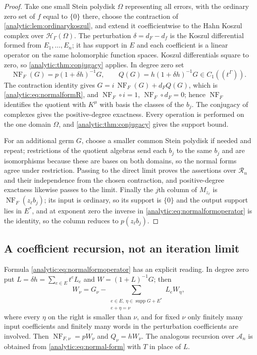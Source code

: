 \documentclass[11pt,letterpaper]{article}
\theoremstyle{definition}
\theoremstyle{remark}
\newcommand{\A}{\mathscr A}
\newcommand{\RR}{\mathscr R}
\newcommand{\HH}{\mathcal H}
\newcommand{\supp}{\operatorname{supp}}
\newcommand{\NF}{\operatorname{NF}}
\numberwithin{equation}{section}
\begin{document}
\begin{proof}
Take one small Stein polydisk $\Omega$ representing all errors, with the
ordinary zero set of $f$ equal to $\{0\}$ there, choose the contraction of
\cref{analytic:lem:ordinarykoszul}, and extend it coefficientwise to the
Hahn Koszul complex over $\HH_\Gamma(\Omega)$. The perturbation
$\delta=d_F-d_f$ is the Koszul differential formed from $E_1,\ldots,E_n$; it
has support in $E$ and each coefficient is a linear operator on the same
holomorphic function spaces. Koszul differentials square to zero, so
\cref{analytic:thm:conjugacy} applies. In degree zero set
\begin{equation}\label{analytic:eq:normalformoperator}
 \NF_F(G)=p(1+\delta h)^{-1}G,\qquad
 Q(G)=h(1+\delta h)^{-1}G\in C_1((t^\Gamma)).
\end{equation}
The contraction identity gives $G=i\,\NF_F(G)+d_FQ(G)$, which is
\eqref{analytic:eq:normalformR}, and $\NF_F\circ i=1$,
$\NF_F\circ d_F=0$; hence $\NF_F$ identifies the quotient with $K^\mu$ with
basis the classes of the $b_j$. The conjugacy of complexes gives the
positive-degree exactness. Every operation is performed on the one domain
$\Omega$, and \cref{analytic:thm:conjugacy} gives the support bound.

For an additional germ $G$, choose a smaller common Stein polydisk if
needed and repeat; restrictions of the quotient algebras send each $b_j$ to
the same $b_j$ and are isomorphisms because these are bases on both
domains, so the normal forms agree under restriction. Passing to the direct
limit proves the assertions over $\RR_n$ and their independence from the
chosen contraction, and positive-degree exactness likewise passes to the
limit. Finally the $j$th column of $M_{z_\ell}$ is $\NF_F(z_\ell b_j)$; its
input is ordinary, so its support is $\{0\}$ and the output support lies in
$E^*$, and at exponent zero the inverse in
\eqref{analytic:eq:normalformoperator} is the identity, so the column
reduces to $p(z_\ell b_j)$.
\end{proof}

\subsection{A coefficient recursion, not an iteration limit}
\label{analytic:subsec:recursion}
Formula \eqref{analytic:eq:normalformoperator} has an explicit reading. In
degree zero put $L=\delta h=\sum_{e\in E}t^eL_e$ and $W=(1+L)^{-1}G$; then
\begin{equation}\label{analytic:eq:Wrecursion}
 W_\nu=G_\nu-\!\!\sum_{\substack{e\in E,\ \eta\in\supp G+E^*\\ e+\eta=\nu}}
 \!\!L_eW_\eta ,
\end{equation}
where every $\eta$ on the right is smaller than $\nu$, and for fixed $\nu$
only finitely many input coefficients and finitely many words in the
perturbation coefficients are involved. Then $\NF_{F,\nu}=pW_\nu$ and
$Q_\nu=hW_\nu$. The analogous recursion over $\A_n$ is obtained from
\eqref{analytic:eq:normal-form} with $T$ in place of $L$.
\end{document}
